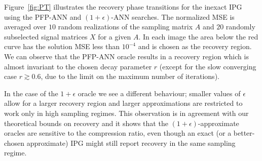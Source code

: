Figure~\ref{fig:PT} illustrates the recovery phase transitions for the inexact IPG using the PFP-ANN and $(1+\epsilon)$-ANN searches. %
The normalized MSE is averaged over $10$ random realizations of the sampling matrix $A$ and $20$ randomly subselected signal matrices $X$ for a given $A$. 
In each image the area below the red curve has the solution MSE less than $10^{-4}$ and is chosen as the recovery region. We can observe that the PFP-ANN oracle results in a  recovery region which is almost invariant to the chosen decay parameter $r$ (except for the slow converging case $r \gtrsim 0.6$, due to the limit on the maximum number of iterations). 

In the case of the $1+\epsilon$ oracle we see a different behaviour; smaller values of $\epsilon$ allow for a larger recovery region and larger approximations are restricted to work only 
in high sampling regimes. This observation is in agreement with our theoretical  bounds on recovery and it shows that the $(1+\epsilon)$-approximate oracles are sensitive to the compression ratio, even though an exact (or a better-chosen approximate) 
IPG might still report recovery in the same sampling regime.

